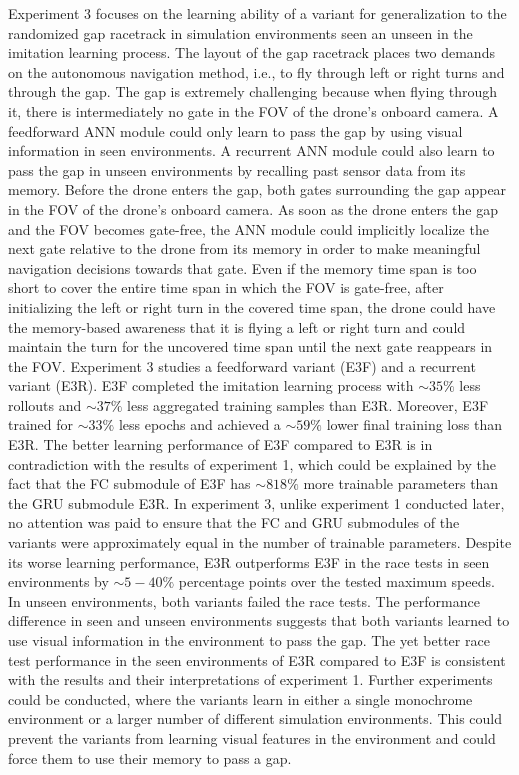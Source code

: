 Experiment 3 focuses on the learning ability of a variant
for generalization to the randomized gap racetrack in simulation environments
seen an unseen in the imitation learning process.
The layout of the gap racetrack places two demands on the autonomous navigation method,
i.e., to fly through left or right turns and through the gap.
The gap is extremely challenging because when flying through it,
there is intermediately no gate in the FOV of the drone's onboard camera.
A feedforward ANN module could only learn to 
pass the gap by using visual information in seen environments.
A recurrent ANN module could also learn to pass the gap in unseen environments
by recalling past sensor data from its memory.
Before the drone enters the gap, both gates surrounding the gap
appear in the FOV of the drone's onboard camera.
As soon as the drone enters the gap and the FOV becomes gate-free,
the ANN module could implicitly localize the next gate relative to the drone
from its memory in order to make meaningful navigation decisions towards that gate.
Even if the memory time span is too short to cover the entire time span in which the FOV is gate-free,
after initializing the left or right turn in the covered time span,
the drone could have the memory-based awareness that it is flying a left or right turn
and could maintain the turn for the uncovered time span
until the next gate reappears in the FOV.
Experiment 3 studies a feedforward variant (E3F) and a recurrent variant (E3R).
E3F completed the imitation learning process
with $\sim 35 \%$ less rollouts and $\sim 37 \%$ less aggregated training samples than E3R.
Moreover, E3F
trained for $\sim 33 \%$ less epochs and  
achieved a $\sim 59 \%$ lower final training loss than E3R.
The better learning performance of E3F compared to E3R
is in contradiction with the results of experiment 1,
which could be explained by the fact
that the FC submodule of E3F has 
$\sim 818 \%$ more trainable parameters than the GRU submodule E3R.
In experiment 3, unlike experiment 1 conducted later,
no attention was paid to ensure
that the FC and GRU submodules of the variants
were approximately equal in the number of trainable parameters.
Despite its worse learning performance,
E3R outperforms E3F in the race tests in seen environments
by $\sim 5 - 40 \%$ percentage points over the tested maximum speeds.
In unseen environments,
both variants failed the race tests.
The performance difference in seen and unseen environments
suggests that both variants learned to use visual information in the environment to pass the gap.
The yet better race test performance in the seen environments of E3R compared to E3F
is consistent with the results and their interpretations of experiment 1.
Further experiments could be conducted,
where the variants learn in 
either a single monochrome environment
or a larger number of different simulation environments.
This could prevent the variants from learning 
visual features in the environment
and could force them to use their memory to pass a gap.




